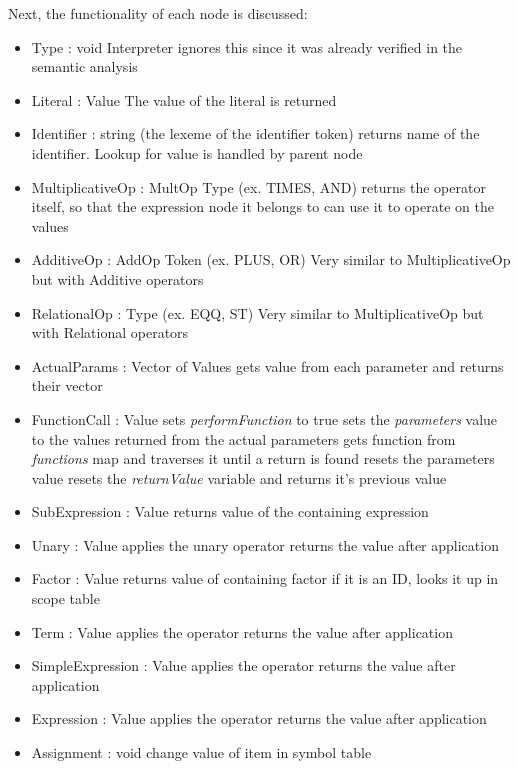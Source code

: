 Next, the functionality of each node is discussed:
\begin{itemize}
	\item Type : void
		\subitem Interpreter ignores this since it was already verified in the semantic analysis
	\item Literal : Value
		\subitem The value of the literal is returned
	\item Identifier : string (the lexeme of the identifier token)
		\subitem returns name of the identifier. Lookup for value is handled by parent node
	\item MultiplicativeOp : MultOp Type (ex. TIMES, AND)
		\subitem returns the operator itself, so that the expression node it belongs to can use it to operate on the values
	\item AdditiveOp : AddOp Token (ex. PLUS, OR)
		\subitem Very similar to MultiplicativeOp but with Additive operators
	\item RelationalOp : Type (ex. EQQ, ST)
		\subitem Very similar to MultiplicativeOp but with Relational operators
	\item ActualParams : Vector of Values
		\subitem gets value from each parameter and returns their vector
	\item FunctionCall : Value
		\subitem sets \textit{performFunction} to true
		\subitem sets the \textit{parameters} value to the values returned from the actual parameters
		\subitem gets function from \textit{functions} map and traverses it until a return is found
		\subitem resets the parameters value
		\subitem resets the \textit{returnValue} variable and returns it's previous value
	\item SubExpression : Value
		\subitem returns value of the containing expression
	\item Unary : Value
		\subitem applies the unary operator
		\subitem returns the value after application
	\item Factor : Value
		\subitem returns value of containing factor
		\subitem if it is an ID, looks it up in scope table
	\item Term : Value
		\subitem applies the operator
		\subitem returns the value after application
	\item SimpleExpression : Value
		\subitem applies the operator
		\subitem returns the value after application
	\item Expression : Value
		\subitem applies the operator
		\subitem returns the value after application
	\item Assignment : void
		\subitem change value of item in symbol table

\end{itemize}
